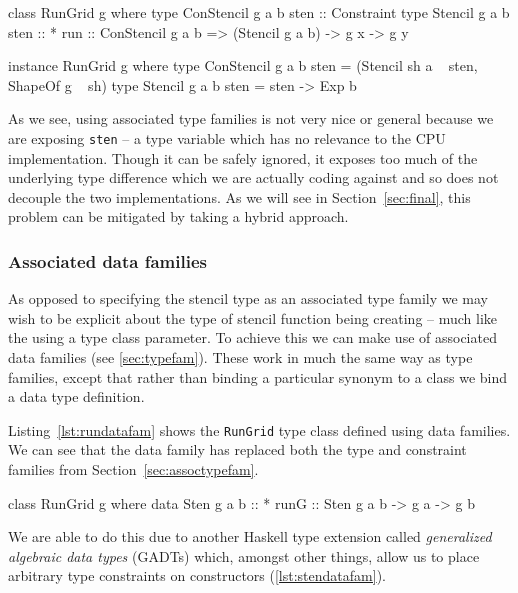 \documentclass[
    12pt,
    a4paper,
    twoside,
    openright,
    ]{scrbook}
\begin{document}
\begin{hflisting}[label={lst:constkind}, caption={The application of type
    families to the run primitive.}]
class RunGrid g where
    type ConStencil g a b sten :: Constraint
    type Stencil g a b sten :: *
    run :: ConStencil g a b => (Stencil g a b) -> g x -> g y

instance RunGrid g where
    type ConStencil g a b sten = (Stencil sh a ~ sten, ShapeOf g ~ sh)
    type Stencil g a b sten = sten -> Exp b
\end{hflisting}

As we see, using associated type families is not very nice or general because we
are exposing \texttt{sten} -- a type variable which has no relevance to the CPU
implementation. Though it can be safely ignored, it exposes too much of the
underlying type difference which we are actually coding against and so does not
decouple the two implementations. As we will see in Section~\ref{sec:final},
this problem can be mitigated by taking a hybrid approach.

\subsubsection{Associated data families}
\label{sec:assoc-data-fam}

As opposed to specifying the stencil type as an associated type family we may
wish to be explicit about the type of stencil function being creating -- much
like the using a type class parameter. To achieve this we can make use of
associated data families (see \autoref{sec:typefam}). These work in much the
same way as type families, except that rather than binding a particular synonym
to a class we bind a data type definition.

Listing~\ref{lst:rundatafam} shows the \texttt{RunGrid} type class defined using
data families. We can see that the data family has replaced both the type and
constraint families from Section~\ref{sec:assoctypefam}.

\begin{hflisting}[label=lst:rundatafam,
caption=RunGrid with associated data family.]
class RunGrid g where
    data Sten g a b :: *
    runG :: Sten g a b -> g a -> g b
\end{hflisting}

We are able to do this due to another Haskell type extension called
\emph{generalized algebraic data types} (GADTs) which, amongst other things,
allow us to place arbitrary type constraints on constructors
(\autoref{lst:stendatafam}).
\end{document}
